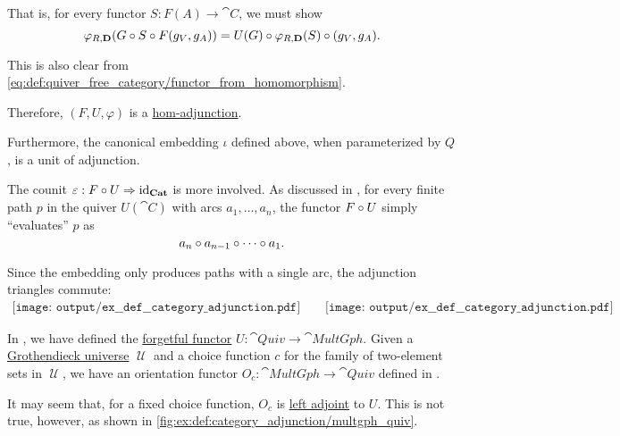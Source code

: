 \begin{example}
\begin{thmenum}
    That is, for every functor \( S: F(A) \to \cat{C} \), we must show
    \begin{equation*}
      \varphi_{R, \cat{D}}(G \bincirc S \bincirc F(g_V, g_A))
      =
      U(G) \bincirc \varphi_{R, \cat{D}}(S) \bincirc (g_V, g_A).
    \end{equation*}

    This is also clear from \eqref{eq:def:quiver_free_category/functor_from_homomorphism}.

    Therefore, \( (F, U, \varphi) \) is a \hyperref[def:category_adjunction/hom]{hom-adjunction}.

    Furthermore, the canonical embedding \( \iota \) defined above, when parameterized by \( Q \), is a unit of adjunction.

    The counit  \( \varepsilon: F \bincirc U \Rightarrow \id_{\cat{Cat}} \) is more involved. As discussed in , for every finite path \( p \) in the quiver \( U(\cat{C}) \) with arcs \( a_1, \ldots, a_n \), the functor \( F \bincirc U \) simply \enquote{evaluates} \( p \) as
    \begin{equation*}
      a_n \bincirc a_{n-1} \bincirc \cdots \bincirc a_1.
    \end{equation*}

    Since the embedding only produces paths with a single arc, the adjunction triangles commute:
    \begin{equation}\label{eq:ex:def:category_adjunction/quiv_cat/triangles}
      \begin{aligned}
        \texttt{[image: output/ex\_\_def\_\_category\_adjunction.pdf]}
        \quad\quad
        \texttt{[image: output/ex\_\_def\_\_category\_adjunction.pdf]}
      \end{aligned}
    \end{equation}

     In , we have defined the \hyperref[rem:forgetful_functor]{forgetful functor} \( U: \hyperref[def:category_of_small_quivers]{\cat{Quiv}} \to \hyperref[def:undirected_multigraph]{\cat{MultGph}} \). Given a \hyperref[def:grothendieck_universe]{Grothendieck universe} \( \mscrU \) and a choice function \( c \) for the family of two-element sets in \( \mscrU \), we have an orientation functor \( O_c: \cat{MultGph} \to \cat{Quiv} \) defined in .

    It may seem that, for a fixed choice function, \( O_c \) is \hyperref[def:category_adjunction]{left adjoint} to \( U \). This is not true, however, as shown in \cref{fig:ex:def:category_adjunction/multgph_quiv}.


\end{thmenum}
\end{example}
